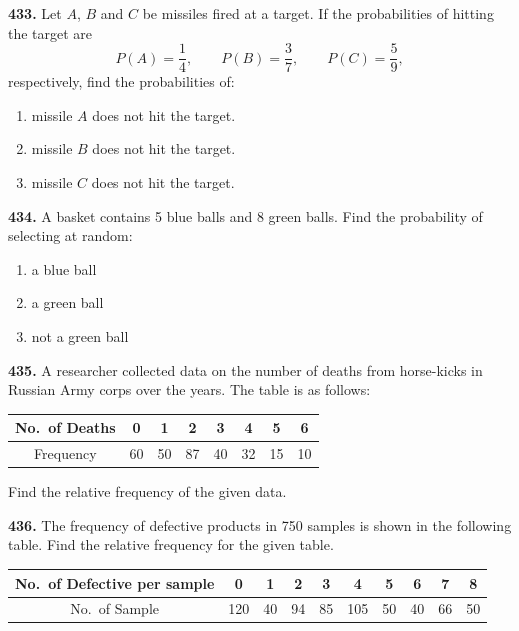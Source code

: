 \documentclass[11pt]{article}
\begin{document}
\bigskip
\noindent\textbf{433.} Let $A$, $B$ and $C$ be missiles fired at a target. If the probabilities of hitting the target are
\[
P(A) = \frac{1}{4}, \qquad P(B) = \frac{3}{7}, \qquad P(C) = \frac{5}{9},
\]
respectively, find the probabilities of:
\begin{enumerate}[label=(\roman*)]
\item missile $A$ does not hit the target.
\item missile $B$ does not hit the target.
\item missile $C$ does not hit the target.
\end{enumerate}

\bigskip
\noindent\textbf{434.} A basket contains 5 blue balls and 8 green balls. Find the probability of selecting at random:
\begin{enumerate}[label=(\roman*)]
\item a blue ball
\item a green ball
\item not a green ball
\end{enumerate}

\bigskip
\noindent\textbf{435.} A researcher collected data on the number of deaths from horse-kicks in Russian Army corps over the years. The table is as follows:

\begin{center}
\begin{tabular}{|c|c|c|c|c|c|c|c|}
\hline
No.\ of Deaths & 0 & 1 & 2 & 3 & 4 & 5 & 6 \\
\hline
Frequency & 60 & 50 & 87 & 40 & 32 & 15 & 10 \\
\hline
\end{tabular}
\end{center}

Find the relative frequency of the given data.

\bigskip
\noindent\textbf{436.} The frequency of defective products in 750 samples is shown in the following table. Find the relative frequency for the given table.

\begin{center}
\begin{tabular}{|c|c|c|c|c|c|c|c|c|c|}
\hline
No.\ of Defective per sample & 0 & 1 & 2 & 3 & 4 & 5 & 6 & 7 & 8 \\
\hline
No.\ of Sample & 120 & 40 & 94 & 85 & 105 & 50 & 40 & 66 & 50 \\
\hline
\end{tabular}
\end{center}
\end{document}
